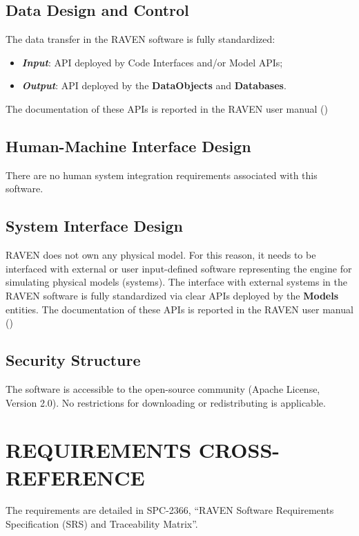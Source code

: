 \subsection{Data Design and Control}
The data transfer in the RAVEN software is fully standardized:
\begin{itemize}
  \item  \textbf{\textit{Input}}: API deployed by Code Interfaces and/or Model APIs;
  \item \textbf{\textit{Output}}: API deployed by the \textbf{DataObjects}  and \textbf{Databases}.
\end{itemize}
The documentation of these APIs is reported in the RAVEN user manual (\cite{RAVENuserManual})

\subsection{Human-Machine Interface Design} 
 There are no human system integration requirements associated with this software.
 \subsection{System Interface Design} 
RAVEN does not own any physical model. For this reason, it needs to be interfaced with external
or user input-defined
software representing the engine for simulating physical models (systems). 
The interface with external systems in the RAVEN software is fully standardized via clear APIs deployed by
 the \textbf{Models} entities.
The documentation of these APIs is reported in the RAVEN user manual (\cite{RAVENuserManual})

 \subsection{Security Structure} 
The software is accessible to the open-source community (Apache License, Version 2.0). No restrictions for downloading or redistributing is applicable.

 \section{REQUIREMENTS CROSS-REFERENCE} 
The requirements are detailed in SPC-2366, ``RAVEN Software Requirements Specification (SRS) and Traceability Matrix''.